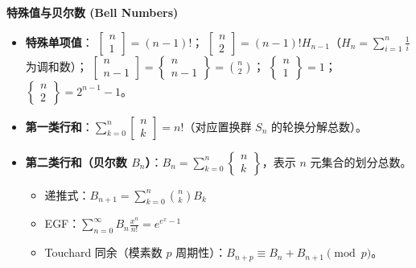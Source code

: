 \textbf{特殊值与贝尔数 (Bell Numbers)}
\begin{itemize}
    \item \textbf{特殊单项值}：
    $\left[ \begin{matrix} n \\ 1 \end{matrix} \right] = (n-1)!$；
    $\left[ \begin{matrix} n \\ 2 \end{matrix} \right] = (n-1)! H_{n-1}$（$H_n = \sum_{i=1}^n \frac{1}{i}$ 为调和数）；
    $\left[ \begin{matrix} n \\ n-1 \end{matrix} \right] = \left\{ \begin{matrix} n \\ n-1 \end{matrix} \right\} = \binom{n}{2}$；
    $\left\{ \begin{matrix} n \\ 1 \end{matrix} \right\} = 1$；
    $\left\{ \begin{matrix} n \\ 2 \end{matrix} \right\} = 2^{n-1} - 1$。
    \item \textbf{第一类行和}：$\sum_{k=0}^n \left[ \begin{matrix} n \\ k \end{matrix} \right] = n!$（对应置换群 $S_n$ 的轮换分解总数）。
    \item \textbf{第二类行和（贝尔数 $B_n$）}：$B_n = \sum_{k=0}^n \left\{ \begin{matrix} n \\ k \end{matrix} \right\}$，表示 $n$ 元集合的划分总数。
    \begin{itemize}
        \item 递推式：$B_{n+1} = \sum_{k=0}^n \binom{n}{k} B_k$
        \item EGF：$\sum_{n=0}^\infty B_n \frac{x^n}{n!} = e^{e^x - 1}$
        \item Touchard 同余（模素数 $p$ 周期性）：$B_{n+p} \equiv B_n + B_{n+1} \pmod p$。
    \end{itemize}
\end{itemize}

